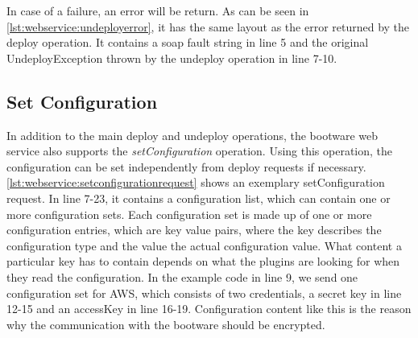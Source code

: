 In case of a failure, an error will be return.
As can be seen in \autoref{lst:webservice:undeployerror}, it has the same layout as the error returned by the deploy operation.
It contains a soap fault string in line 5 and the original UndeployException thrown by the undeploy operation in line 7-10.

\vspace*{\baselineskip}

\subsection{Set Configuration}

In addition to the main deploy and undeploy operations, the bootware web service also supports the \textit{setConfiguration} operation.
Using this operation, the configuration can be set independently from deploy requests if necessary.
\autoref{lst:webservice:setconfigurationrequest} shows an exemplary setConfiguration request.
In line 7-23, it contains a configuration list, which can contain one or more configuration sets.
Each configuration set is made up of one or more configuration entries, which are key value pairs, where the key describes the configuration type and the value the actual configuration value.
What content a particular key has to contain depends on what the plugins are looking for when they read the configuration.
In the example code in line 9, we send one configuration set for AWS, which consists of two credentials, a secret key in line 12-15 and an accessKey in line 16-19.
Configuration content like this is the reason why the communication with the bootware should be encrypted.

\vspace*{\baselineskip}

